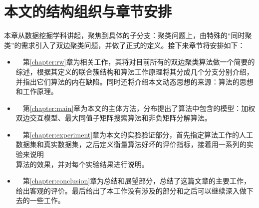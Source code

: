 \section{本文的结构组织与章节安排}
本章从数据挖掘学科讲起，聚焦到具体的子分支：聚类问题上，由特殊的“同时聚类”的需求引入了双边聚类问题，并做了正式的定义。接下来章节将安排如下：

\vspace{2mm}
\begin{itemize}
  \item ~~第\ref{chapter:rw}章为相关工作，其将对目前所有的双边聚类算法做一个简要的综述，根据其定义的联合簇结构和算法工作原理将其分成几个分支分别介绍，并指出它们算法的内在缺陷。同时还将介绍本文动态思想的来源：\Sync{}算法的思想和工作原理。
  \vspace{1mm}
  \item ~~第\ref{chapter:main}章为本文的主体方法，分布提出了\CoSync{}算法中包含的模型：加权双边交互模型、最大同值子矩阵搜索算法和非负矩阵分解算法。
  \vspace{1mm}
  \item ~~第\ref{chapter:experiment}章为本文的实验验证部分，首先指定算法工作的人工数据集和真实数据集，之后定义衡量算法好坏的评价指标，接着用一系列的实验来说明\CoSync{}\\算法的效果，并对每个实验结果进行说明。
  \vspace{1mm}
  \item ~~第\ref{chapter:conclusion}章为总结和展望部分，总结了这篇文章的主要工作，给出客观的评价。最后给出了本工作没有涉及的部分和之后可以继续深入做下去的一些工作。
\end{itemize}

\newpage\mbox{}\thispagestyle{empty}\newpage
